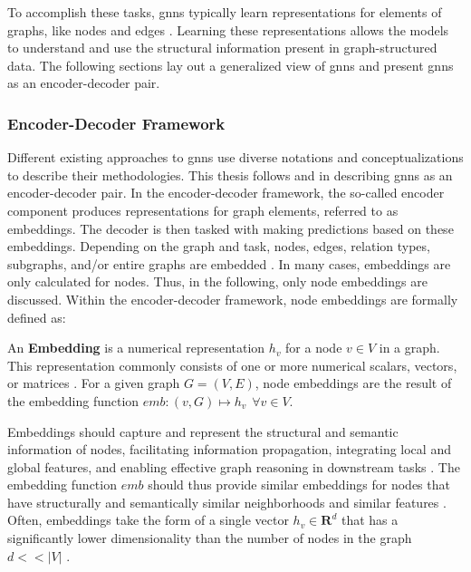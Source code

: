 To accomplish these tasks, \glspl{gnn} typically learn representations for elements of graphs, like nodes and edges \cite{zhou_graph_2020}. Learning these representations allows the models to understand and use the structural information present in graph-structured data. The following sections lay out a generalized view of \glspl{gnn} and present \glspl{gnn} as an encoder-decoder pair.

\subsubsection{Encoder-Decoder Framework}
\label{s_Background_GNNs_EncoderDecoderFramework}

Different existing approaches to \glspl{gnn} use diverse notations and conceptualizations to describe their methodologies. This thesis follows \cite{hamilton_representation_2017} and \cite{kazemi_representation_2019} in describing \glspl{gnn} as an encoder-decoder pair.
In the encoder-decoder framework, the so-called encoder component produces representations for graph elements, referred to as embeddings. The decoder is then tasked with making predictions based on these embeddings. Depending on the graph and task, nodes, edges, relation types, subgraphs, and/or entire graphs are embedded \cite{barros_survey_2023}. In many cases, embeddings are only calculated for nodes. Thus, in the following, only node embeddings are discussed. Within the encoder-decoder framework, node embeddings are formally defined as: 

\begin{definition}
    \label{d_Embedding}
    An \textbf{Embedding} is a numerical representation $h_v$ for a node $v \in V$ in a graph. This representation commonly consists of one or more numerical scalars, vectors, or matrices \cite{kazemi_representation_2019}. For a given graph $G = (V, E)$, node embeddings are the result of the embedding function $emb: (v, G) \mapsto h_v \hspace{5pt} \forall v \in V$.
\end{definition}

Embeddings should capture and represent the structural and semantic information of nodes, facilitating information propagation, integrating local and global features, and enabling effective graph reasoning in downstream tasks \cite{goyal_graph_2018}. The embedding function $emb$ should thus provide similar embeddings for nodes that have structurally and semantically similar neighborhoods and similar features \cite{goyal_graph_2018, bronstein_geometric_2021}.
Often, embeddings take the form of a single vector $h_v \in \mathbf{R}^d$ that has a significantly lower dimensionality than the number of nodes in the graph $d<<|V|$ \cite{goyal_graph_2018}. 

